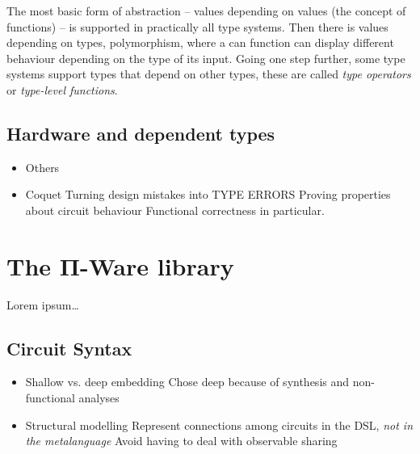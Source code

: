 \documentclass[a4paper,draft]{report}
\begin{document}
            The most basic form of abstraction -- values depending on values (the concept of functions) -- is
            supported in practically all type systems.
            Then there is values depending on types, polymorphism, where a can function can display different
            behaviour depending on the type of its input.
            Going one step further, some type systems support types that depend on other types, these are
            called \emph{type operators} or \emph{type-level functions}.

        \section{Hardware and dependent types}
        \label{sec:hardware-dtp}
            \begin{itemize}
                \item Others
                \item Coquet
                    \subitem Turning design mistakes into TYPE ERRORS
                    \subitem Proving properties about circuit behaviour
                    \subsubitem Functional correctness in particular.
            \end{itemize}


    \chapter{The Π-Ware library}
    \label{chap:piware}
        Lorem ipsum\ldots


        \section{Circuit Syntax}
        \label{sec:circuit-types}
            \begin{itemize}
                \item Shallow vs. deep embedding
                    \subitem Chose deep because of synthesis and non-functional analyses
                \item Structural modelling
                    \subitem Represent connections among circuits in the DSL, \emph{not in the metalanguage}
                    \subitem Avoid having to deal with observable sharing
            \end{itemize}
\end{document}
